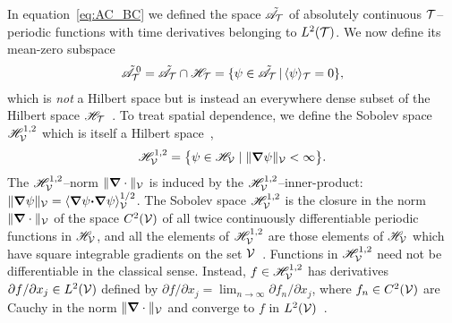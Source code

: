 \documentclass[amsa]{ipart}
\begin{document}
In equation~\eqref{eq:AC_BC} we defined the space $\tilde{\mathscr{A}}_{\mathcal{T}}$ of
absolutely continuous $\mathcal{T}$--periodic functions with time derivatives
belonging to $L^2(\mathcal{T})$. We now define its mean-zero subspace
%
\begin{align}\label{eq:Abs_Cont_Mean_Zero}
  \tilde{\As}^{\,0}_{\Tc}=\tilde{\As}_{\Tc}\cap\Hs_{\Tc}
                  =\{\psi\in\tilde{\As}_{\Tc}\,|\,  \langle\psi\rangle_{\Tc}=0\},
\end{align}
%
which is \emph{not} a Hilbert space but is instead an everywhere dense
subset of the Hilbert space $\mathscr{H}_{\mathcal{T}}$~\cite{Stone:64}. To treat
spatial dependence, we define
the Sobolev space $\mathscr{H}^{1,2}_{\mathcal{V}}$ which is itself a Hilbert
space~\cite{Bhattacharya:AAP:1999:951,Folland:95:PDEs,McOwen:2003:PDE},             
% 
\begin{align}\label{eq:Sobolev}
  \Hs^{1,2}_{\Vc}=\big\{\psi\in \Hs_{\Vc} \; | \; \|\bnabla\psi\|_{\Vc}<\infty\big\}.
\end{align}
%
The $\mathscr{H}^{1,2}_{\mathcal{V}}$--norm $\|\mbox{\boldmath${\nabla}$}\cdot\|_{\mathcal{V}}$ is induced by the
$\mathscr{H}^{1,2}_{\mathcal{V}}$--inner-product:
$\|\mbox{\boldmath${\nabla}$}\psi\|_{\mathcal{V}}=\langle\mbox{\boldmath${\nabla}$}\psi\mbox{\boldmath${\cdot}$}\mbox{\boldmath${\nabla}$}\psi\rangle_{\mathcal{V}}^{1/2}$. 
The Sobolev space $\mathscr{H}^{1,2}_{\mathcal{V}}$  is the closure in the norm
$\|\mbox{\boldmath${\nabla}$}\cdot\|_{\mathcal{V}}$ of the space $C^2(\mathcal{V})$ of all twice continuously
differentiable periodic functions in $\mathscr{H}_{\mathcal{V}}$, and all the elements
of $\mathscr{H}^{1,2}_{\mathcal{V}}$ are those elements of $\mathscr{H}_{\mathcal{V}}$ which have
square integrable gradients on the set
$\mathcal{V}$~\cite{Bhattacharya:AAP:1999:951}. Functions in $\mathscr{H}^{1,2}_{\mathcal{V}}$
need not be differentiable in the classical 
sense. Instead, $f\in\mathscr{H}^{1,2}_{\mathcal{V}}$ has derivatives $\partial f/\partial x_j\in
L^2(\mathcal{V})$ defined by $\partial f/\partial x_j=\lim_{n\to\infty}\partial f_n/\partial x_j$, where $f_n\in
C^2(\mathcal{V})$ are Cauchy in the norm $\|\mbox{\boldmath${\nabla}$}\cdot\|_{\mathcal{V}}$ and converge to
$f$ in $L^2(\mathcal{V})$~\cite{McOwen:2003:PDE}. 
\end{document}
